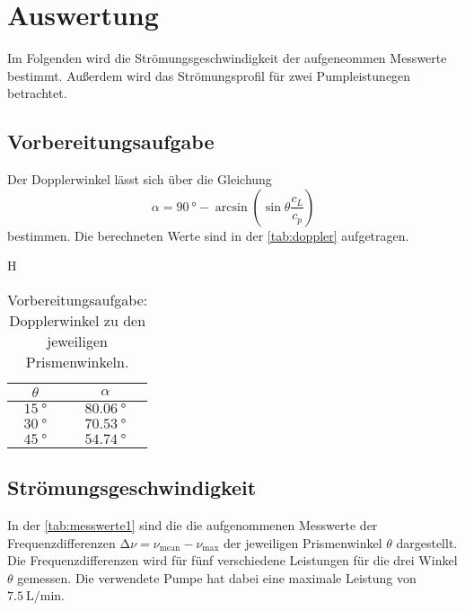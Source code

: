 \section{Auswertung}
\label{sec:auswertung}

Im Folgenden wird die Strömungsgeschwindigkeit der aufgeneommen Messwerte bestimmt.
Außerdem wird das Strömungsprofil für zwei Pumpleistunegen betrachtet.

\subsection{Vorbereitungsaufgabe}
\label{sec:Vorbereitungsaufgabe}

Der Dopplerwinkel lässt sich über die Gleichung 
\begin{equation*}
    \alpha = \qty{90}{°} - \arcsin\left(\sin\theta \frac{c_L}{c_p}\right)
\end{equation*}
bestimmen. Die berechneten Werte sind in der \autoref{tab:doppler} aufgetragen.

\begin{table}{H}
    \centering
    \caption{Vorbereitungsaufgabe: Dopplerwinkel zu den jeweiligen Prismenwinkeln.}
    \label{tab:doppler}
\begin{tabular}{c c}
    \toprule
    $\theta$ & $\alpha$ \\
    \midrule
    $\qty{15}{°}$ & $\qty{80.06}{°}$ \\
    $\qty{30}{°}$ & $\qty{70.53}{°}$ \\
    $\qty{45}{°}$ & $\qty{54.74}{°}$ \\
    \bottomrule
\end{tabular}
\end{table}

\subsection{Strömungsgeschwindigkeit}
\label{sec:Strömungsgeschwindigkeit}

In der \autoref{tab:messwerte1} sind die die aufgenommenen Messwerte der Frequenzdifferenzen $ \increment \nu = \nu_{\text{mean}} - \nu_{\text{max}}$ 
der jeweiligen Prismenwinkel $\theta$ dargestellt. Die Frequenzdifferenzen wird für fünf verschiedene Leistungen für die drei Winkel $\theta$ gemessen. Die 
verwendete Pumpe hat dabei eine maximale Leistung von $\SI{7.5}{\liter\per\minute}$.

